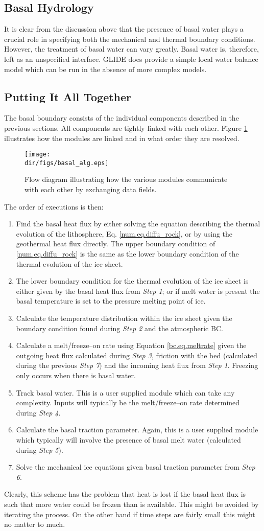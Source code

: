 

\subsection{Basal Hydrology}
It is clear from the discussion above that the presence of basal water plays a crucial role in specifying both the mechanical and thermal boundary conditions. However, the treatment of basal water can vary greatly. Basal water is, therefore, left as an unspecified interface. GLIDE does provide a simple local water balance model which can be run in the absence of more complex models.

\subsection{Putting It All Together}
The basal boundary consists of the individual components described in the previous sections. All components are tightly linked with each other. Figure \ref{num.fig.bc_flow} illustrates how the modules are linked and in what order they are resolved.
\begin{figure}[htbp]
  \centering
  \texttt{[image: \\dir/figs/basal\_alg.eps]}
  \caption{Flow diagram illustrating how the various modules communicate with each other by exchanging data fields.}
  \label{num.fig.bc_flow}
\end{figure}
The order of executions is then:
\begin{enumerate}
\item Find the basal heat flux by either solving the equation describing the thermal evolution of the lithosphere, Eq. \eqref{num.eq.diffu_rock}, or by using the geothermal heat flux directly. The upper boundary condition of \eqref{num.eq.diffu_rock} is the same as the lower boundary condition of the thermal evolution of the ice sheet.
\item The lower boundary condition for the thermal evolution of the ice sheet is either given by the basal heat flux from \emph{Step 1}; or if melt water is present the basal temperature is set to the pressure melting point of ice.
\item Calculate the temperature distribution within the ice sheet given the boundary condition found during \emph{Step 2} and the atmospheric BC.
\item Calculate a melt/freeze--on rate using Equation \eqref{bc.eq.meltrate} given the outgoing heat flux calculated during \emph{Step 3}, friction with the bed (calculated during the previous \emph{Step 7}) and the incoming heat flux from \emph{Step 1}. Freezing only occurs when there is basal water.
\item Track basal water. This is a user supplied module which can take any complexity. Inputs will typically be the melt/freeze--on rate determined during \emph{Step 4}.
\item Calculate the basal traction parameter. Again, this is a user supplied module which typically will involve the presence of basal melt water (calculated during \emph{Step 5}).
\item Solve the mechanical ice equations given basal traction parameter from \emph{Step 6}.
\end{enumerate}
Clearly, this scheme has the problem that heat is lost if the basal heat flux is such that more water could be frozen than is available. This might be avoided by iterating the process. On the other hand if time steps are fairly small this might no matter to much.
